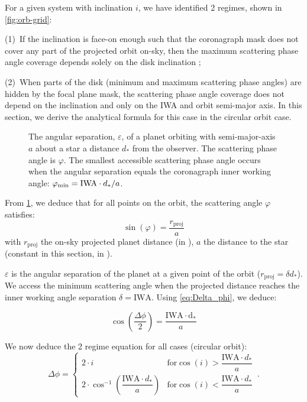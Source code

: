 \documentclass[
    usenatbib,
]{mnras}
\begin{document}
For a given system with inclination $i$, we have identified 2 regimes, shown in \cref{fig:orb-grid}:

(1)~If the inclination is face-on enough such that the coronagraph mask does not cover any part of the projected orbit on-sky, then the maximum scattering phase angle coverage depends solely on the disk inclination ;

(2)~When parts of the disk (minimum and maximum scattering phase angles) are hidden by the focal plane mask, the scattering phase angle coverage does not depend on the inclination and only on the IWA and orbit semi-major axis. In this section, we derive the analytical formula for this case in the circular orbit case. 

\begin{figure}%
    \centering
    
    \caption{
        The angular separation, $\varepsilon$, of a planet orbiting with semi-major-axis $a$ about a star a distance $d_*$ from the observer. 
        The scattering phase angle is $\varphi$. 
        The smallest accessible scattering phase angle occurs when the angular separation equals the coronagraph inner working angle: $\varphi_{\rm min} = {\rm IWA} \cdot d_*/a$.
    }
    \label{fig:scattering_angles}
\end{figure}

From \cref{fig:scattering_angles}, we deduce that for all points on the orbit, the scattering angle $\varphi$ satisfies:
\begin{equation}
    \sin(\varphi) = \frac{r_\mathrm{proj}}{a}
\end{equation}
with $r_\mathrm{proj}$ the on-sky projected planet distance (in \si{\au}), $a$ the distance to the star (constant in this section, in \si{\au}). 

$\varepsilon$ is the angular separation of the planet at a given point of the orbit ($r_\mathrm{proj} = \delta d_*$). 
We access the minimum scattering angle when the projected distance reaches the inner working angle separation $\delta = \mathrm{IWA}$. 
Using \cref{eq:Delta_phi}, we deduce:

\begin{equation}
    \cos\left(\dfrac{\Delta \phi}{2}\right) = \frac{\mathrm{IWA \cdot d_*}}{a}
\end{equation}

We now deduce the 2 regime equation for all cases (circular orbit): 
\begin{equation}
\label{eq:Delta_phi_max}
    \Delta \phi = 
    \begin{cases}
        2 \cdot i & \textrm{for} \cos(i) > \dfrac{\mathrm{IWA}\cdot d_* }{a}
  \\ 
        2 \cdot \cos^{-1}\left(\dfrac{\mathrm{IWA}\cdot d_* }{a}\right)  & \textrm{for} \cos(i) < \dfrac{\mathrm{IWA}\cdot d_* }{a}
    \end{cases}\,.
\end{equation}
\end{document}
